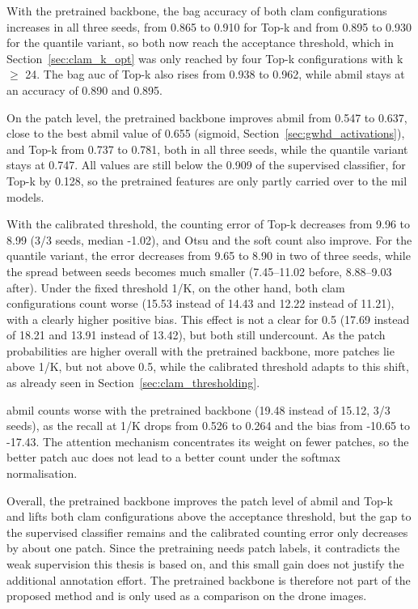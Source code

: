 \documentclass[12pt,parskip = half, DIV=classic,listof=totoc]{scrartcl}
\begin{document}
			With the pretrained backbone, the bag accuracy of both \ac{clam} configurations increases in all three 
			seeds, from 0.865 to 0.910 for Top-k and from 0.895 to 0.930 for the quantile variant, 
			so both now reach the acceptance threshold, which in Section~\ref{sec:clam_k_opt} was only reached by 
			four Top-k configurations with k $\geq$ 24. The bag \ac{auc} of Top-k also rises from 0.938 to 
			0.962, while \ac{abmil} stays at an accuracy of 0.890 and 0.895.

			On the patch level, the pretrained backbone improves \ac{abmil} from 0.547 to 0.637, 
			close to the best \ac{abmil} value of 0.655 (sigmoid, Section~\ref{sec:gwhd_activations}), and Top-k from 
			0.737 to 0.781, both in all three seeds, while the quantile variant stays at 0.747. 
			All values are still below the 0.909 of the supervised classifier, for Top-k by 0.128, 
			so the pretrained features are only partly carried over to the \ac{mil} models.

			With the calibrated threshold, the counting error of Top-k decreases from 9.96 to 8.99 
			(3/3 seeds, median -1.02), and Otsu and the soft count also improve. For the quantile 
			variant, the error decreases from 9.65 to 8.90 in two of three seeds, while the spread 
			between seeds becomes much smaller (7.45–11.02 before, 8.88–9.03 after). Under the fixed 
			threshold 1/K, on the other hand, both \ac{clam} configurations count worse (15.53 instead of 
			14.43 and 12.22 instead of 11.21), with a clearly higher positive bias. This effect is not a clear for 0.5
			(17.69 instead of 18.21 and 13.91 instead of 13.42), but both still undercount. As the patch 
			probabilities are higher overall with the pretrained backbone, more patches lie above 1/K, but not above 0.5, 
			while the calibrated threshold adapts to this shift, as already seen in Section~\ref{sec:clam_thresholding}.

			\Ac{abmil} counts worse with the pretrained backbone (19.48 instead of 15.12, 3/3 seeds), 
			as the recall at 1/K drops from 0.526 to 0.264 and the bias from -10.65 to -17.43. 
			The attention mechanism concentrates its weight on fewer patches, so the better patch 
			\ac{auc} does not lead to a better count under the softmax normalisation.

			Overall, the pretrained backbone improves the patch level of \ac{abmil} and Top-k and lifts 
			both \ac{clam} configurations above the acceptance threshold, but the gap to the supervised 
			classifier remains and the calibrated counting error only decreases by about one patch. 
			Since the pretraining needs patch labels, it contradicts the weak supervision this thesis is 
			based on, and this small gain does not justify the additional annotation effort. The pretrained backbone 
			is therefore not part of the proposed method and is only used as a comparison on the drone images.
\end{document}
